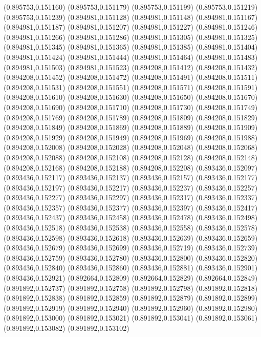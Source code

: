 (0.895753,0.151160)
(0.895753,0.151179)
(0.895753,0.151199)
(0.895753,0.151219)
(0.895753,0.151239)
(0.894981,0.151128)
(0.894981,0.151148)
(0.894981,0.151167)
(0.894981,0.151187)
(0.894981,0.151207)
(0.894981,0.151227)
(0.894981,0.151246)
(0.894981,0.151266)
(0.894981,0.151286)
(0.894981,0.151305)
(0.894981,0.151325)
(0.894981,0.151345)
(0.894981,0.151365)
(0.894981,0.151385)
(0.894981,0.151404)
(0.894981,0.151424)
(0.894981,0.151444)
(0.894981,0.151464)
(0.894981,0.151483)
(0.894981,0.151503)
(0.894981,0.151523)
(0.894208,0.151412)
(0.894208,0.151432)
(0.894208,0.151452)
(0.894208,0.151472)
(0.894208,0.151491)
(0.894208,0.151511)
(0.894208,0.151531)
(0.894208,0.151551)
(0.894208,0.151571)
(0.894208,0.151591)
(0.894208,0.151610)
(0.894208,0.151630)
(0.894208,0.151650)
(0.894208,0.151670)
(0.894208,0.151690)
(0.894208,0.151710)
(0.894208,0.151730)
(0.894208,0.151749)
(0.894208,0.151769)
(0.894208,0.151789)
(0.894208,0.151809)
(0.894208,0.151829)
(0.894208,0.151849)
(0.894208,0.151869)
(0.894208,0.151889)
(0.894208,0.151909)
(0.894208,0.151929)
(0.894208,0.151949)
(0.894208,0.151969)
(0.894208,0.151988)
(0.894208,0.152008)
(0.894208,0.152028)
(0.894208,0.152048)
(0.894208,0.152068)
(0.894208,0.152088)
(0.894208,0.152108)
(0.894208,0.152128)
(0.894208,0.152148)
(0.894208,0.152168)
(0.894208,0.152188)
(0.894208,0.152208)
(0.893436,0.152097)
(0.893436,0.152117)
(0.893436,0.152137)
(0.893436,0.152157)
(0.893436,0.152177)
(0.893436,0.152197)
(0.893436,0.152217)
(0.893436,0.152237)
(0.893436,0.152257)
(0.893436,0.152277)
(0.893436,0.152297)
(0.893436,0.152317)
(0.893436,0.152337)
(0.893436,0.152357)
(0.893436,0.152377)
(0.893436,0.152397)
(0.893436,0.152417)
(0.893436,0.152437)
(0.893436,0.152458)
(0.893436,0.152478)
(0.893436,0.152498)
(0.893436,0.152518)
(0.893436,0.152538)
(0.893436,0.152558)
(0.893436,0.152578)
(0.893436,0.152598)
(0.893436,0.152618)
(0.893436,0.152639)
(0.893436,0.152659)
(0.893436,0.152679)
(0.893436,0.152699)
(0.893436,0.152719)
(0.893436,0.152739)
(0.893436,0.152759)
(0.893436,0.152780)
(0.893436,0.152800)
(0.893436,0.152820)
(0.893436,0.152840)
(0.893436,0.152860)
(0.893436,0.152881)
(0.893436,0.152901)
(0.893436,0.152921)
(0.892664,0.152809)
(0.892664,0.152829)
(0.892664,0.152849)
(0.891892,0.152737)
(0.891892,0.152758)
(0.891892,0.152798)
(0.891892,0.152818)
(0.891892,0.152838)
(0.891892,0.152859)
(0.891892,0.152879)
(0.891892,0.152899)
(0.891892,0.152919)
(0.891892,0.152940)
(0.891892,0.152960)
(0.891892,0.152980)
(0.891892,0.153000)
(0.891892,0.153021)
(0.891892,0.153041)
(0.891892,0.153061)
(0.891892,0.153082)
(0.891892,0.153102)
